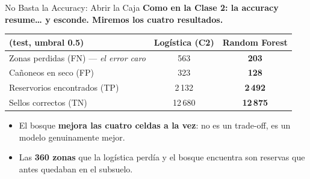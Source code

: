 \documentclass[aspectratio=169, 11pt]{beamer}
\begin{document}
\begin{frame}[shrink=10]{No Basta la Accuracy: Abrir la Caja}
  \vspace{-4pt}
  {\small\color{arcaDark}\bfseries
    Como en la Clase 2: la accuracy resume\ldots{} y esconde. Miremos los cuatro resultados.}

  \vspace{6pt}
  \centering
  {\footnotesize
  \renewcommand{\arraystretch}{1.6}
  \begin{tabular}{@{}l c c@{}}
    \toprule
    {\bfseries\color{arcaDark} (test, umbral 0.5)} & {\bfseries\color{textMuted} Logística (C2)} & {\bfseries\color{codeGreen} Random Forest} \\
    \midrule
    \rowcolor{arcaGray}
    Zonas perdidas (FN) --- \textit{el error caro} & 563 & {\color{codeGreen}\bfseries 203} \\
    Cañoneos en seco (FP) & 323 & {\color{codeGreen}\bfseries 128} \\
    \rowcolor{arcaGray}
    Reservorios encontrados (TP) & 2\,132 & \bfseries 2\,492 \\
    Sellos correctos (TN) & 12\,680 & \bfseries 12\,875 \\
    \bottomrule
  \end{tabular}
  }

  \vspace{8pt}
  {\footnotesize\color{textMuted}
  \begin{itemize}\setlength{\itemsep}{4pt}
    \item[{\color{codeGreen}\scriptsize\faCheck}]
      El bosque \textbf{mejora las cuatro celdas a la vez}: no es un trade-off,
      es un modelo genuinamente mejor.
    \item[{\color{arcaRed}\scriptsize\faArrowRight}]
      Las \textbf{360 zonas} que la logística perdía y el bosque encuentra
      son reservas que antes quedaban en el subsuelo.
  \end{itemize}
  }
\end{frame}
\end{document}
